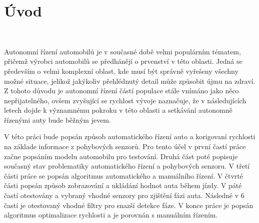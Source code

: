 \chapter*{Úvod}
\label{sec:Introduction}
\

Autonomní řízení automobilů je v současné době velmi populárním tématem, přičemž výrobci automobilů
se předhánějí o prvenství v této oblasti. Jedná se především o velmi komplexní oblast, kde
musí být správně vyřešeny všechny možné situace, jelikož jakýkoliv přehlédnutý detail může
způsobit újmu na zdraví. Z tohoto důvodu je autonomní řízení částí populace stále vnímáno jako něco 
nepřijatelného, ovšem zvyšující se rychlost vývoje naznačuje, že v následujících letech dojde k významnému pokroku v této oblasti a setkávání autonomně řízenými auty bude běžným jevem.

V této práci bude popsán způsob automatického řízení auto a korigovaní rychlosti na základe informace z pohybových senzorů.
Pro tento účel v první častí práce začne popsáním modelu automobilu pro testování. Druhá část poté popisuje současný stav problematiky automatického řízení a pohybových senzoru. V třetí části práce se popsán algoritmus automatického a manuálního řízení. V čtvrté části popsán způsob zobrazování a ukládání hodnot auta během jízdy. V páté častí otestovány a vybraný vhodné senzory pro zjištění fázi auta. Následné v 6 častí je otestovaný vhodné filtry pro snazší detekce fáze. V konce práce je popsán algoritmus optimalizace rychlosti a je porovnán s manuálním řízením.

\endinput
